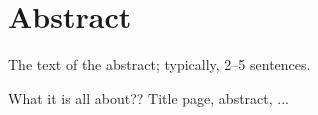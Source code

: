 \chapter*{Abstract}                   %
The text of the abstract;
typically, 2--5 sentences.

What it is all about??
Title page, abstract, ...